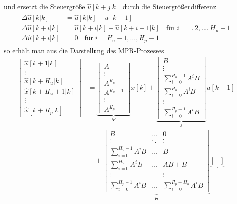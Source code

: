 und ersetzt die Steuergröße $\hat{u}[k+j|k]$ durch die Steuergrößendifferenz
\begin{align}
\begin{split}\label{eqn:kap_4_steuergroessendiff}
	\Delta\hat{u}[k|k] & = \hat{u}[k|k]-u[k-1]\\
	\Delta\hat{u}[k+i|k] & = \hat{u}[k+i|k]-\hat{u}[k+i-1|k]\quad\text{für }i=1,2,\ldots,H_u-1\\
	\Delta\hat{u}[k+i|k] & = 0\quad\text{für }i=H_u-1,\ldots,H_p-1
\end{split}
\end{align}
so erhält man aus  die Darstellung des \ac{MPR}-Prozesses
\begin{align*}
\begin{bmatrix}
\hat{x}[k+1|k]\\
\vdots\\
\hat{x}[k+H_u|k]\\
\hat{x}[k+H_u+1|k]\\
\vdots\\
\hat{x}[k+H_p|k]
\end{bmatrix} & = \underbrace{\begin{bmatrix}
A\\ \vdots\\ A^{H_u}\\ A^{H_u+1}\\ \vdots\\ A^{H_p}
\end{bmatrix}}_{\Psi}x[k]+\underbrace{\begin{bmatrix}
B\\ \vdots \\ \sum_{i=0}^{H_u-1}A^iB\\ \sum_{i=0}^{H_u}A^iB\\ \vdots \\ \sum_{i=0}^{H_p-1}A^iB
\end{bmatrix}}_{\Upsilon}u[k-1]\\
&\quad +\underbrace{\begin{bmatrix}
B 						&	\ldots 	& 	0\\
\vdots					&	\ddots	& 	\vdots\\
\sum_{i=0}^{H_u-1}A^iB	& \ldots	& 	B\\
\sum_{i=0}^{H_u}A^iB	& \ldots	& 	AB+B\\
\vdots					&			& 	\vdots\\
\sum_{i=0}^{H_p-1}A^iB	& \ldots	& 	\sum_{i=0}^{H_p-H_u}A^iB
\end{bmatrix}}_{\Theta} \underbrace{\begin{bmatrix}

\end{bmatrix}}
\end{align*}
